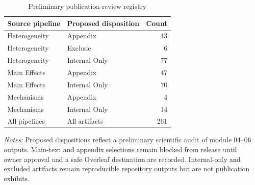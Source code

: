 \begin{table}[!htbp]
\centering\small
\caption{Preliminary publication-review registry}
\label{tab:publication_candidate_inventory}
\begin{tabular}{llr}
\toprule
Source pipeline & Proposed disposition & Count \\
\midrule
Heterogeneity & Appendix & 43 \\
Heterogeneity & Exclude & 6 \\
Heterogeneity & Internal Only & 77 \\
Main Effects & Appendix & 47 \\
Main Effects & Internal Only & 70 \\
Mechanisms & Appendix & 4 \\
Mechanisms & Internal Only & 14 \\
\midrule
All pipelines & All artifacts & 261 \\
\bottomrule\end{tabular}
\parbox{0.97\linewidth}{\footnotesize \textit{Notes:} Proposed dispositions reflect a preliminary scientific audit of module 04--06 outputs. Main-text and appendix selections remain blocked from release until owner approval and a safe Overleaf destination are recorded. Internal-only and excluded artifacts remain reproducible repository outputs but are not publication exhibits.}
\end{table}
